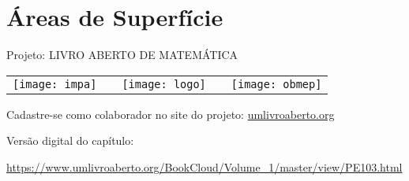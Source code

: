 
\ifnum {}
\renewcommand\chapterillustration{abertura-superficie}
\else
\renewcommand\chapterillustration{abertura-superficie-professor}
\fi

\renewcommand\chapterwhat{A partir de situações do cotidiano, mesmo que uma superfície não seja plana, entender o conceito de área de modo que possa diferenciá-lo de outras grandezas, e identificar suas propriedades. Estabelecer métodos de medição da grandeza “área” e interpretá-los em contextos reais. }
\renewcommand\chapterbecause{É fundamental saber identificar e determinar áreas de figuras planas ou espaciais visto que, em atividades cotidianas, temos a necessidade de realizar medições de áreas para resolver problemas. Para poder explorar os problemas práticos, é fundamental conhecer o conceito de área de uma figura, como um tópico que permite compreender as expressões que trabalham os elementos determinantes do conceito de área, e os procedimentos que as aplicações práticas demandam.}
\chapter{Áreas de Superfície}
\label{est1-chap}

\mbox{}\thispagestyle{empty}\clearpage

\thispagestyle{empty}

\begin{center}
Projeto: LIVRO ABERTO DE MATEMÁTICA

\noindent \begin{tabular}{lcccr}
\texttt{[image: impa]}& \quad\quad& \texttt{[image: logo]} & \quad\quad& \texttt{[image: obmep]} 
\end{tabular}
\end{center}

\vspace*{.3cm}

Cadastre-se como colaborador no site do projeto: \url{umlivroaberto.org}

Versão digital do capítulo:

\url{https://www.umlivroaberto.org/BookCloud/Volume_1/master/view/PE103.html}


